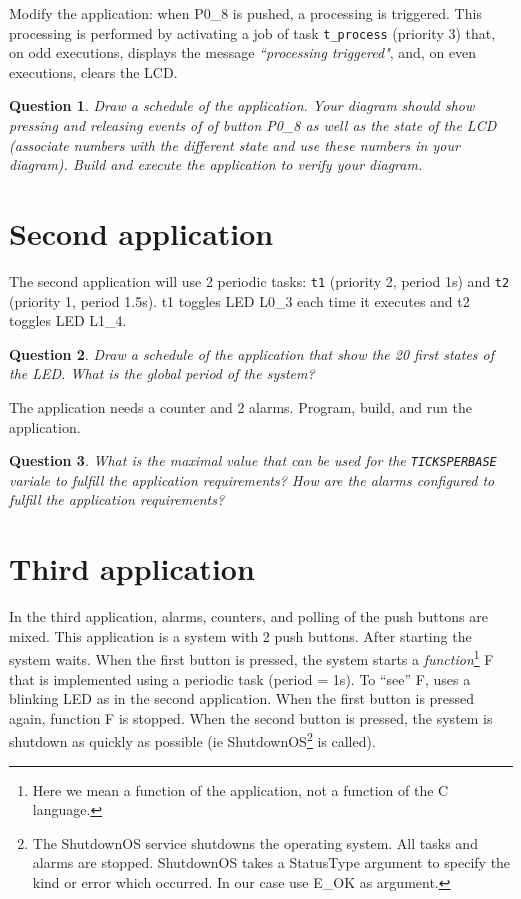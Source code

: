 \documentclass[11pt]{report}
\newtheorem{ex}{Question}
\begin{document}
Modify the application: when P0_8 is pushed, a processing is triggered.
This processing is performed by activating a job of task \texttt{t_process} (priority 3) that, on odd executions, displays the message \textsl{``processing triggered"}, and, on even executions, clears the LCD.
\begin{ex}
Draw a schedule of the application.
Your diagram should show pressing and releasing events of of button P0_8 as well as the state of the LCD (associate numbers with the different state and use these numbers in your diagram).
Build and execute the application to verify your diagram.
\end{ex}


\section{Second application}

The second application will use 2 periodic tasks: \texttt{t1} (priority 2, period 1s) and \texttt{t2} (priority 1, period 1.5s). t1 toggles LED L0_3 each time it executes and t2 toggles LED L1_4.

\begin{ex}
    Draw a schedule of the application that show the 20 first states of the LED.
    What is the global period of the system?
\end{ex}

The application needs a counter and 2 alarms. Program, build, and run the application.

\begin{ex}
What is the maximal value that can be used for the \texttt{TICKSPERBASE} variale to fulfill the application requirements?
How are the alarms configured to fulfill the application requirements?
\end{ex}

\section{Third application}

In the third application, alarms, counters, and polling of the push buttons are mixed.
This application is a system with 2 push buttons.
After starting the system waits.
When the first button is pressed, the system starts a {\it function}\footnote{Here we mean a function of the application, not a function of the C language.} F that is implemented using a periodic task (period = 1s).
To ``see'' F, uses a blinking LED as in the second application.
When the first button is pressed again, function F is stopped.
When the second button is pressed, the system is shutdown as quickly as possible (ie ShutdownOS\footnote{The ShutdownOS service shutdowns the operating system. All tasks and alarms are stopped. ShutdownOS takes a StatusType argument to specify the kind or error which occurred. In our case use E_OK as argument.} is called).
\end{document}
